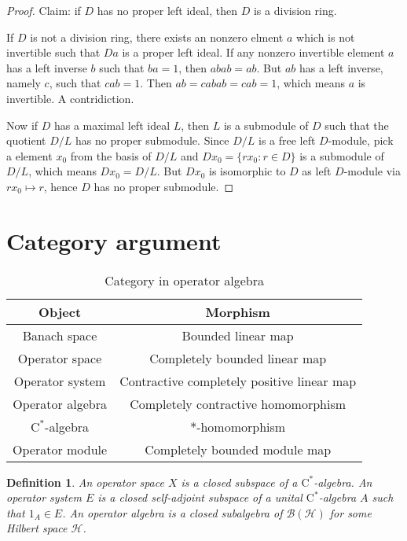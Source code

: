 \documentclass{article}
\newtheorem{definition}{Definition}[section]
\begin{document}
\begin{proof}
Claim: if $D$ has no proper left ideal, then $D$ is a division ring.

If $D$ is not a division ring, there exists an nonzero elment $a$ which is not invertible such that $Da$ is a proper left ideal.
If any nonzero invertible element $a$ has a left inverse $b$ such that $ba=1$, then $abab=ab$. But $ab$ has a left inverse, namely $c$, such that $cab=1$.
Then $ab=cabab=cab=1$, which means $a$ is invertible. A contridiction.

Now if $D$ has a maximal left ideal $L$, then $L$ is a submodule of $D$ such that the quotient $D/L$ has no proper submodule. Since $D/L$ is a free left $D$-module, pick a element $x_0$ from the basis of $D/L$ and $D x_0 = \{ r x_0 : r \in D\}$ is a submodule of $D/L$, which means $D x_0 = D/L$. But $D x_0$ is isomorphic to $D$ as left $D$-module via $r x_0 \mapsto r$, hence $D$ has no proper submodule.

\end{proof}


\section{Category argument}

\begin{table}[!htbp]
  \centering
  \caption{Category in operator algebra}
  \begin{tabular}{cc}
      \toprule
      Object & Morphism \\
      \midrule
      Banach space & Bounded linear map \\
      Operator space & Completely bounded linear map\\
      Operator system & Contractive completely positive linear map\\
      Operator algebra & Completely contractive homomorphism \\
      $\mathrm{C}^*$-algebra & $*$-homomorphism \\
      Operator module & Completely bounded module map \\
      \bottomrule
  \end{tabular}
\end{table}

\begin{definition}
An operator space $X$ is a closed subspace of a $\mathrm{C}^*$-algebra. An operator system $E$ is a closed self-adjoint subspace of a unital $\mathrm{C}^*$-algebra $A$ such that $1_A \in E$. An operator algebra is a closed subalgebra of $\mathcal{B}(\mathcal{H})$ for some Hilbert space $\mathcal{H}$.
\end{definition}
\end{document}
